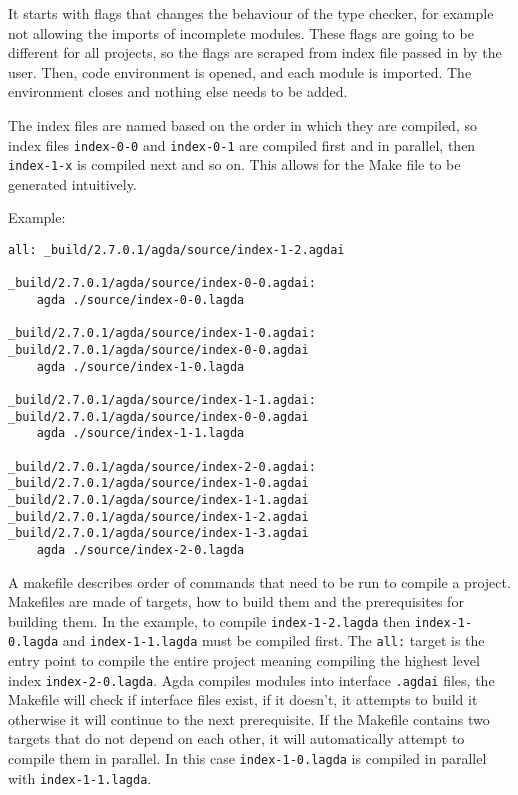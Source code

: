 It starts with flags that changes the behaviour of the type checker, for
example not allowing the imports of incomplete modules. These flags are going
to be different for all projects, so the flags are scraped from index file
passed in by the user. Then, code environment is opened, and each module is
imported. The environment closes and nothing else needs to be added.

The index files are named based on the order in which they are compiled, so
index files \texttt{index-0-0} and \texttt{index-0-1} are compiled first and in
parallel, then \texttt{index-1-x} is compiled next and so on. This allows for
the Make file to be generated intuitively. 

Example:

\begin{lstlisting}
all: _build/2.7.0.1/agda/source/index-1-2.agdai 

_build/2.7.0.1/agda/source/index-0-0.agdai: 
	agda ./source/index-0-0.lagda

_build/2.7.0.1/agda/source/index-1-0.agdai: _build/2.7.0.1/agda/source/index-0-0.agdai 
	agda ./source/index-1-0.lagda

_build/2.7.0.1/agda/source/index-1-1.agdai: _build/2.7.0.1/agda/source/index-0-0.agdai 
	agda ./source/index-1-1.lagda

_build/2.7.0.1/agda/source/index-2-0.agdai: _build/2.7.0.1/agda/source/index-1-0.agdai _build/2.7.0.1/agda/source/index-1-1.agdai _build/2.7.0.1/agda/source/index-1-2.agdai _build/2.7.0.1/agda/source/index-1-3.agdai 
	agda ./source/index-2-0.lagda
\end{lstlisting}

A makefile describes order of commands that need to be run to compile a
project. Makefiles are made of targets, how to build them and the prerequisites
for building them. In the example, to compile \texttt{index-1-2.lagda} then
\texttt{index-1-0.lagda} and \texttt{index-1-1.lagda} must be compiled first.
The \texttt{all:} target is the entry point to compile the entire project
meaning compiling the highest level index \texttt{index-2-0.lagda}. Agda
compiles modules into interface \texttt{.agdai} files, the Makefile will check
if interface files exist, if it doesn't, it attempts to build it otherwise it
will continue to the next prerequisite. If the Makefile contains two targets
that do not depend on each other, it will automatically attempt to compile them
in parallel. In this case \texttt{index-1-0.lagda} is compiled in parallel with
\texttt{index-1-1.lagda}.


